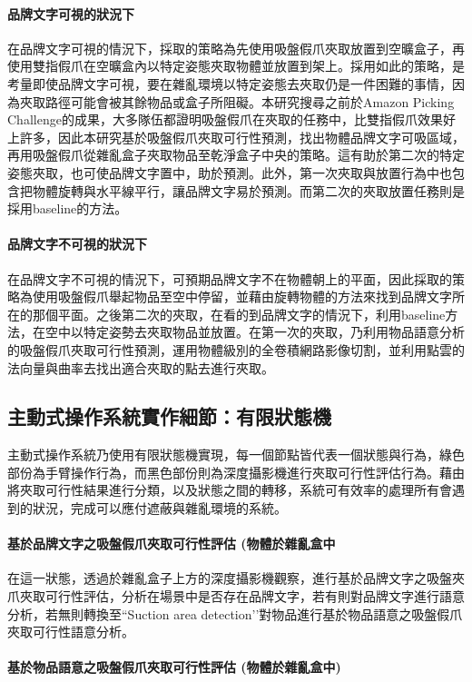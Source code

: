 \paragraph{品牌文字可視的狀況下}
在品牌文字可視的情況下，採取的策略為先使用吸盤假爪夾取放置到空曠盒子，再使用雙指假爪在空曠盒內以特定姿態夾取物體並放置到架上。採用如此的策略，是考量即使品牌文字可視，要在雜亂環境以特定姿態去夾取仍是一件困難的事情，因為夾取路徑可能會被其餘物品或盒子所阻礙。本研究搜尋之前於Amazon Picking Challenge的成果，大多隊伍都證明吸盤假爪在夾取的任務中，比雙指假爪效果好上許多，因此本研究基於吸盤假爪夾取可行性預測，找出物體品牌文字可吸區域，再用吸盤假爪從雜亂盒子夾取物品至乾淨盒子中央的策略。這有助於第二次的特定姿態夾取，也可使品牌文字置中，助於預測。此外，第一次夾取與放置行為中也包含把物體旋轉與水平線平行，讓品牌文字易於預測。而第二次的夾取放置任務則是採用baseline的方法。

\paragraph{品牌文字不可視的狀況下}
在品牌文字不可視的情況下，可預期品牌文字不在物體朝上的平面，因此採取的策略為使用吸盤假爪舉起物品至空中停留，並藉由旋轉物體的方法來找到品牌文字所在的那個平面。之後第二次的夾取，在看的到品牌文字的情況下，利用baseline方法，在空中以特定姿勢去夾取物品並放置。在第一次的夾取，乃利用物品語意分析的吸盤假爪夾取可行性預測，運用物體級別的全卷積網路影像切割，並利用點雲的法向量與曲率去找出適合夾取的點去進行夾取。

\subsection{主動式操作系統實作細節：有限狀態機}

主動式操作系統乃使用有限狀態機實現，每一個節點皆代表一個狀態與行為，綠色部份為手臂操作行為，而黑色部份則為深度攝影機進行夾取可行性評估行為。藉由將夾取可行性結果進行分類，以及狀態之間的轉移，系統可有效率的處理所有會遇到的狀況，完成可以應付遮蔽與雜亂環境的系統。

\paragraph{基於品牌文字之吸盤假爪夾取可行性評估 (物體於雜亂盒中}
在這一狀態，透過於雜亂盒子上方的深度攝影機觀察，進行基於品牌文字之吸盤夾爪夾取可行性評估，分析在場景中是否存在品牌文字，若有則對品牌文字進行語意分析，若無則轉換至``Suction area detection’’對物品進行基於物品語意之吸盤假爪夾取可行性語意分析。

\paragraph{基於物品語意之吸盤假爪夾取可行性評估 (物體於雜亂盒中)}

